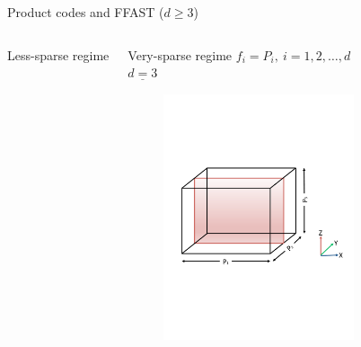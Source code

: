 \begin{frame}{Product codes and FFAST ($d \geq 3$)}
\begin{columns}
\begin{block}{Less-sparse regime}
		\end{block}
		\begin{block}{Very-sparse regime}
			\color{red} $f_i= P_i,\ i=1,2, \ldots,d$\\ \vspace{0.2in}
			\vspace{-2mm}
			\color{blue} $\underline{d=3}$
			\vspace{-3mm}
			\begin{figure}[t]
				\centering
				\includegraphics[width=2.2in]{./Figures/very-sparse}
			\end{figure}
			
		\end{block}
	\end{columns}
		
		
	\end{frame}
%		
